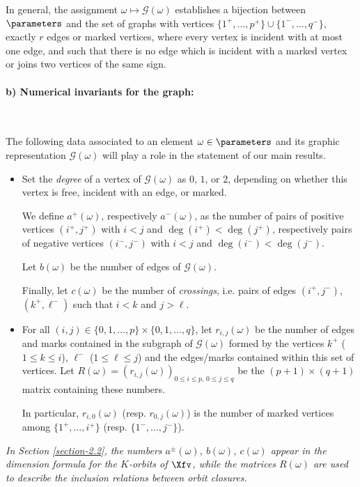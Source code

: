 In general, the assignment $\omega\mapsto\mathcal{G}(\omega)$ establishes a bijection between $\parameters$ and the set of graphs with vertices %
$\{1^+,\ldots,p^+\}\cup\{1^-,\ldots,q^-\}$,
exactly $r$ edges or marked vertices, where every vertex is incident with at most one edge, and such that there is no edge which is incident with a marked vertex or joins two vertices of the same sign.


\paragraph{\bf b) Numerical invariants for the graph:}\

The following data associated to an element $\omega\in\parameters$ and its graphic representation $\mathcal{G}(\omega)$ will play a role in the statement of our main results.
\begin{itemize}
\item Set the {\em degree} of a vertex of $\mathcal{G}(\omega)$ as $0$, $1$, or $2$, depending on whether this vertex is free, incident with an edge, or marked.

We define $a^+(\omega)$, respectively $a^-(\omega)$, as the number of pairs
of positive vertices $(i^+,j^+)$ with $i<j$ and $\deg(i^+)<\deg(j^+)$,
respectively pairs of negative vertices $(i^-,j^-)$ with $i<j$ and $\deg(i^-)<\deg(j^-)$.

Let $b(\omega)$ be the number of edges of $\mathcal{G}(\omega)$.

Finally, let $c(\omega)$ be the number of \textit{crossings}, i.e. pairs of edges $(i^+,j^-)$, $(k^+,\ell^-)$ such that $i<k$ and $j>\ell$.

\item For all $(i,j)\in\{0,1,\ldots,p\}\times\{0,1,\ldots,q\}$, let $r_{i,j}(\omega)$ be the number of edges and marks contained in the subgraph of $\mathcal{G}(\omega)$ formed by the vertices $k^+$ ($1\leq k\leq i$), $\ell^-$ ($1\leq \ell\leq j$) and the edges/marks contained within this set of vertices. Let $R(\omega)=\left( r_{i,j}(\omega) \right)_{0\leq i\leq p,\,0\leq j\leq q}$ be the $(p+1)\times(q+1)$ matrix containing these numbers.

In particular, $r_{i,0}(\omega)$ (resp. $r_{0,j}(\omega)$) is the
number of marked vertices among
$\{1^+,\ldots,i^+\}$ (resp. $\{1^-,\ldots,j^-\}$).
\end{itemize}
{\em In Section \ref{section-2.2}, the numbers $a^\pm(\omega)$, $b(\omega)$, $c(\omega)$ appear in the dimension formula for the $K$-orbits of $\Xfv$, while the matrices $R(\omega)$ are used to describe the inclusion relations between orbit closures.}
